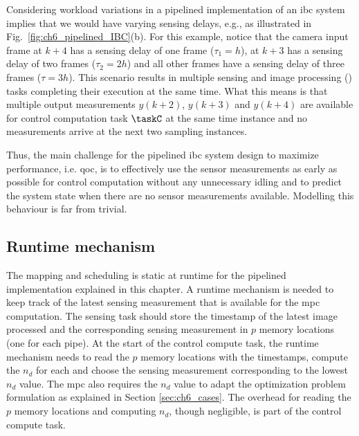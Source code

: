 Considering workload variations in a pipelined implementation of an \gls{ibc} system implies that we would have varying sensing delays, e.g., as illustrated in Fig.~\ref{fig:ch6_pipelined_IBC}(b). 
For this example, notice that the camera input frame at $k+4$ has a sensing delay of one frame ($\tau_1=h$), at $k+3$ has a sensing delay of two frames ($\tau_2=2h$) and all other frames have a sensing delay of three frames ($\tau=3h$). 
This scenario results in multiple sensing and image processing (\taskS) tasks completing their execution at the same time.
What this means is that multiple output measurements $y(k+2)$, $y(k+3)$ and $y(k+4)$ are available for control computation task $\taskC$ at the same time instance and no measurements arrive at the next two sampling instances. 

Thus, the main challenge for the pipelined \gls{ibc} system design to maximize performance, i.e. \gls{qoc}, is to effectively use the sensor measurements as early as possible for control computation without any unnecessary idling and to predict the system state when there are no sensor measurements available. Modelling this behaviour is far from trivial. 

\subsection{Runtime mechanism}
The mapping and scheduling is static at runtime for the pipelined implementation explained in this chapter.
A runtime mechanism is needed to keep track of the latest sensing measurement that is available for the \gls{mpc} computation. 
The sensing task should store the timestamp of the latest image processed and the corresponding sensing measurement in $p$ memory locations (one for each pipe).
At the start of the control compute task, the runtime mechanism needs to read the $p$ memory locations with the timestamps, compute the $n_d$ for each and choose the sensing measurement corresponding to the lowest $n_d$ value. The \gls{mpc} also requires the $n_d$ value to adapt the optimization problem formulation as explained in Section \ref{sec:ch6_cases}.
The overhead for reading the $p$ memory locations and computing $n_d$, though negligible, is part of the control compute task.